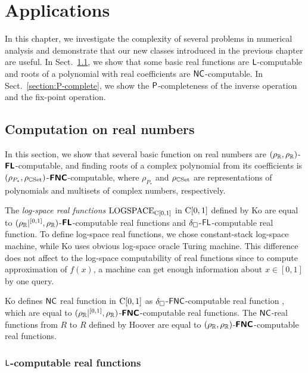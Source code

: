 \documentclass[envcountsame,orivec,oribibl]{llncs}
\begin{document}
\section{Applications}
\label{chapter:applications}
In this chapter, we investigate the complexity of several problems in numerical
analysis and demonstrate that our new classes introduced in the previous
chapter are useful.
In Sect.~\ref{section:function}, 
we show that some basic real functions are $\mathsf{L}$-computable and
roots of a polynomial with real coefficients are $\mathsf{NC}$-computable.
In Sect.~\ref{section:P-complete}, we show the $\mathsf{P}$-completeness of 
the inverse operation and the fix-point operation.

\subsection{Computation on real numbers}
\label{section:function}

In this section, we show that several basic function on real numbers are
 $(\rho _\mathbb R, \rho _\mathbb R)$-$\text{\bfseries \sffamily \upshape FL}$-computable,
and finding roots of a complex polynomial from its coefficients is 
$(\rho_{P_*}, \rho_{\mathbb C\mathrm{Set}})$-$\text{\bfseries \sffamily \upshape FNC}$-computable,
where $\rho_{P_*}$ and $\rho_{\mathbb C\mathrm{Set}}$ are representations of 
polynomials and multisets of complex numbers, respectively.

The {\em log-space real functions} $\mathrm{LOGSPACE}_{\mathrm C[0,1]}$ in 
$\mathrm C[0,1]$ defined by Ko \cite{ko1991complexity} 
are equal to $(\rho _\mathbb R|^{[0,1]}, \rho _\mathbb R)$-$\text{\bfseries \sffamily \upshape FL}$-computable real functions
and $\delta _\square$-$\mathsf{FL}$-computable real function.
To define log-space real functions, 
we chose constant-stack log-space machine,
while Ko uses obvious log-space oracle Turing machine.
This difference does not affect to the log-space computability of real functions
since to compute approximation of $f(x)$,
a machine can get enough information about $x \in [0,1]$ by one query.

Ko defines $\mathsf{NC}$ real function in $\mathrm C[0,1]$
as $\delta _\square$-$\mathsf{FNC}$-computable real function \cite{ko1991complexity},
which are equal to $(\rho _\mathbb R|^{[0,1]}, \rho _\mathbb R)$-$\text{\bfseries \sffamily \upshape FNC}$-computable real functions.
The $\mathsf{NC}$-real functions from $R$ to $R$ defined by Hoover \cite{hoover1991real}
are equal to $(\rho _\mathbb R, \rho _\mathbb R)$-$\text{\bfseries \sffamily \upshape FNC}$-computable real functions.



\subsubsection{$\mathsf{L}$-computable real functions}
\end{document}

